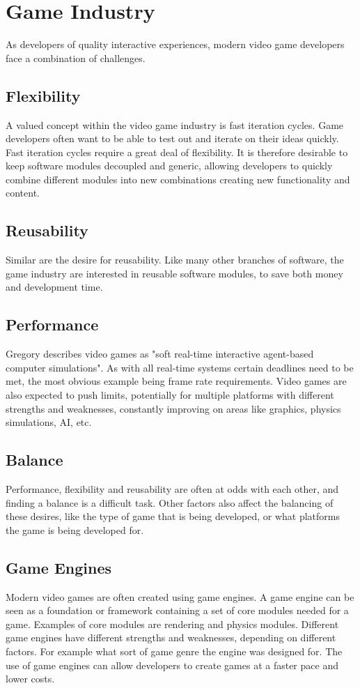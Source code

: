 \section{Game Industry}
As developers of quality interactive experiences, modern video game developers face a
combination of challenges.

\subsection{Flexibility}
A valued concept within the video game industry is fast iteration cycles.
Game developers often want to be able to test out and iterate on their ideas quickly.
Fast iteration cycles require a great deal of flexibility.
It is therefore desirable to keep software modules decoupled and generic,
allowing developers to quickly combine different modules into new combinations creating new functionality
and content.

\subsection{Reusability}
Similar are the desire for reusability.
Like many other branches of software, the game industry are interested in reusable software modules,
to save both money and development time.

\subsection{Performance}
\label{subsec:introduction_game_industry_performance}
Gregory\cite[p. 9]{game_engine_architecture} describes video games as "soft real-time interactive agent-based computer simulations".
As with all real-time systems certain deadlines need to be met, the most obvious example being frame rate requirements.
Video games are also expected to push limits, potentially for multiple platforms with different strengths and weaknesses,
constantly improving on areas like graphics, physics simulations, AI, etc.

\subsection{Balance}
Performance, flexibility and reusability are often at odds with each other, and finding a balance is a difficult task.
Other factors also affect the balancing of these desires, like the type of game that is being developed,
or what platforms the game is being developed for.

\subsection{Game Engines}
Modern video games are often created using game engines. A game engine can be seen as a foundation or framework
containing a set of core modules needed for a game. Examples of core modules are rendering and physics modules.
Different game engines have different strengths and weaknesses, depending on different factors.
For example what sort of game genre the engine was designed for.
The use of game engines can allow developers to create games at a faster pace and lower costs.
